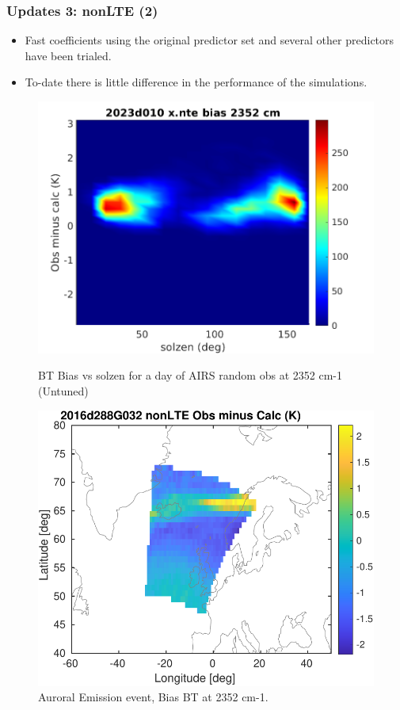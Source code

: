 \documentclass[10pt,t]{beamer}
\begin{document}
\begin{frame}
  \frametitle{Updates 3: nonLTE (2)}
  \begin{itemize}
  \item Fast coefficients using the original predictor set and several other predictors have been
    trialed.
  \item To-date there is little difference in the performance of the simulations.
\end{itemize}
  
\begin{figure}
\begin{minipage}[c]{0.45\linewidth}
  \includegraphics[width=\linewidth]{./Figs/2023d010_airs_xnte_bias_vs_solz_pcolor2.png}
  \caption{BT Bias vs solzen for a day of AIRS random obs at 2352 cm-1 (Untuned)}
\end{minipage}
\hfill
\begin{minipage}[c]{0.45\linewidth}
  \includegraphics[width=\linewidth]{./Figs/2016d288g032_nlte_bias_obs_calc_map.pdf}
  \caption{Auroral Emission event, Bias BT at 2352 cm-1.}
\end{minipage}%
\end{figure}


\end{frame}      
\end{document}
